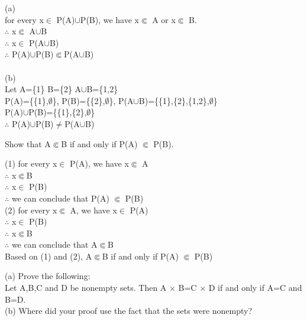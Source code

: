 \documentclass[11pt, a4paper, UTF8]{ctexart}
\begin{document}
\begin{solution}
(a)\\
for every x$\in$ P(A)$\cup$P(B), we have x$\Subset$ A or x$\Subset$ B.\\
$\therefore$ x$\Subset$ A$\cup$B\\
$\therefore$ x$\in$ P(A$\cup$B)\\
$\therefore$ P(A)$\cup$P(B)$\Subset$P(A$\cup$B)\\
\\
(b)\\
Let A=\{1\} B=\{2\} A$\cup$B=\{1,2\}\\
P(A)=\{\{1\},$\emptyset$\}, P(B)=\{\{2\},$\emptyset$\}, P(A$\cup$B)=\{\{1\},\{2\},\{1,2\},$\emptyset$\}\\
P(A)$\cup$P(B)=\{\{1\},\{2\},$\emptyset$\}\\
$\therefore$ P(A)$\cup$P(B)$\not=$P(A$\cup$B)\\

\end{solution}




\begin{problem}[UD:9.4]
Show that A$\Subset$B if and only if P(A) $\Subset$ P(B).
\end{problem}


\begin{solution}
(1) for every x$\in$ P(A), we have x$\Subset$ A\\
$\therefore$ x$\Subset$B\\
$\therefore$ x$\in$ P(B)\\
$\therefore$ we can conclude that P(A) $\Subset$ P(B)\\
(2) for every x$\Subset$ A, we have x$\in$ P(A)\\
$\therefore$ x$\in$ P(B)\\
$\therefore$ x$\Subset$B\\
$\therefore$ we can conclude that A$\Subset$B\\
Based on (1) and (2), A$\Subset$B if and only if P(A) $\Subset$ P(B)\\
\end{solution}





\begin{problem}[UD:9.12]
(a) Prove the following:\\
\indent Let A,B,C and D be nonempty sets. Then A $\times$ B=C $\times$ D if and only if A=C and B=D.\\
(b) Where did your proof use the fact that the sets were nonempty?
\end{problem}
\end{document}
